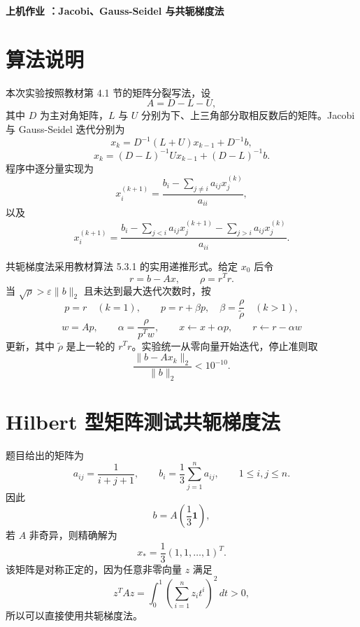\documentclass[a4paper,11pt]{article}
\begin{document}
\begin{center}
    \Large\textbf{上机作业 ：Jacobi、Gauss-Seidel 与共轭梯度法}
\end{center}

\section{算法说明}
本次实验按照教材第 4.1 节的矩阵分裂写法，设
\[
    A=D-L-U,
\]
其中 $D$ 为主对角矩阵，$L$ 与 $U$ 分别为下、上三角部分取相反数后的矩阵。Jacobi 与
Gauss-Seidel 迭代分别为
\[
    x_k=D^{-1}(L+U)x_{k-1}+D^{-1}b,
\]
\[
    x_k=(D-L)^{-1}Ux_{k-1}+(D-L)^{-1}b.
\]
程序中逐分量实现为
\[
    x_i^{(k+1)}
    =\frac{b_i-\sum_{j\ne i}a_{ij}x_j^{(k)}}{a_{ii}},
\]
以及
\[
    x_i^{(k+1)}
    =
    \frac{b_i-\sum_{j<i}a_{ij}x_j^{(k+1)}
    -\sum_{j>i}a_{ij}x_j^{(k)}}{a_{ii}}.
\]

共轭梯度法采用教材算法 5.3.1 的实用递推形式。给定 $x_0$ 后令
\[
    r=b-Ax,\qquad \rho=r^Tr.
\]
当 $\sqrt{\rho}>\varepsilon\|b\|_2$ 且未达到最大迭代次数时，按
\[
    p=r \quad (k=1),\qquad
    p=r+\beta p,\quad \beta=\frac{\rho}{\tilde\rho}\quad (k>1),
\]
\[
    w=Ap,\qquad \alpha=\frac{\rho}{p^Tw},\qquad
    x\leftarrow x+\alpha p,\qquad r\leftarrow r-\alpha w
\]
更新，其中 $\tilde\rho$ 是上一轮的 $r^Tr$。实验统一从零向量开始迭代，停止准则取
\[
    \frac{\|b-Ax_k\|_2}{\|b\|_2}<10^{-10}.
\]

\section{Hilbert 型矩阵测试共轭梯度法}
题目给出的矩阵为
\[
    a_{ij}=\frac{1}{i+j+1},\qquad
    b_i=\frac13\sum_{j=1}^n a_{ij},\qquad 1\le i,j\le n.
\]
因此
\[
    b=A\left(\frac13\mathbf 1\right),
\]
若 $A$ 非奇异，则精确解为
\[
    x_\ast=\frac13(1,1,\ldots,1)^T.
\]
该矩阵是对称正定的，因为任意非零向量 $z$ 满足
\[
    z^TAz=\int_0^1\left(\sum_{i=1}^n z_i t^i\right)^2\,dt>0,
\]
所以可以直接使用共轭梯度法。
\end{document}
